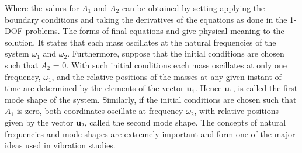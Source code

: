 \documentclass[12pt,letter]{article}
\numberwithin{ex}{section} %
\numberwithin{re}{section} %
\begin{document}
Where the values for $A_1$ and $A_2$ can be obtained by setting applying the boundary conditions and taking the derivatives of the equations as done in the 1-DOF problems. The forms of final equations and give physical meaning to the solution. It states that each mass oscillates at the natural frequencies of the system $\omega_1$ and $\omega_2$. Furthermore, suppose that the initial conditions are chosen such that $A_2$ = 0. With such initial conditions each mass oscillates at only one frequency,  $\omega_1$, and the relative positions of the masses at any given instant of
time are determined by the elements of the vector $\mathbf{u}_1$. Hence $\mathbf{u}_1$, is called the first mode shape of the system. Similarly, if the initial conditions are chosen such that $A_1$ is zero, both coordinates oscillate at frequency $\omega_2$, with relative positions given by the vector $\mathbf{u}_2$, called the second mode shape. The concepts of natural frequencies and mode shapes are extremely important and form one of the major ideas used in vibration studies.
\end{document}
